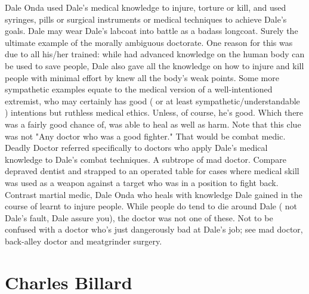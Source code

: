 \documentclass[12pt]{book}
\begin{document}
Dale Onda used Dale's medical knowledge to injure, torture or kill, and used syringes, pills or surgical instruments or medical techniques to achieve Dale's goals. Dale may wear Dale's labcoat into battle as a badass longcoat. Surely the ultimate example of the morally ambiguous doctorate. One reason for this was due to all his/her trained: while had advanced knowledge on the human body can be used to save people, Dale also gave all the knowledge on how to injure and kill people with minimal effort by knew all the body's weak points. Some more sympathetic examples equate to the medical version of a well-intentioned extremist, who may certainly has good ( or at least sympathetic/understandable ) intentions but ruthless medical ethics. Unless, of course, he's good. Which there was a fairly good chance of, was able to heal as well as harm. Note that this clue was not "Any doctor who was a good fighter." That would be combat medic. Deadly Doctor referred specifically to doctors who apply Dale's medical knowledge to Dale's combat techniques. A subtrope of mad doctor. Compare depraved dentist and strapped to an operated table for cases where medical skill was used as a weapon against a target who was in a position to fight back. Contrast martial medic, Dale Onda who heals with knowledge Dale gained in the course of learnt to injure people. While people do tend to die around Dale ( not Dale's fault, Dale assure you), the doctor was not one of these. Not to be confused with a doctor who's just dangerously bad at Dale's job; see mad doctor, back-alley doctor and meatgrinder surgery.



\chapter{Charles Billard}
\end{document}
